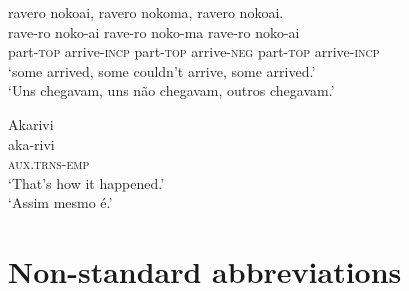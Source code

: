\documentclass[output=paper,
modfonts,nonflat
]{langsci/langscibook}
\begin{document}
\ea ravero nokoai, ravero nokoma, ravero nokoai. \\[.3em]
\gll rave-ro           noko-ai              rave-ro           noko-ma             rave-ro           noko-ai              \\
     part-\textsc{top} arrive-\textsc{incp} part-\textsc{top} arrive-\textsc{neg} part-\textsc{top} arrive-\textsc{incp} \\
\glt `some arrived, some couldn't arrive, some arrived.' \\
`Uns chegavam, uns não chegavam, outros chegavam.' \\
\z

\ea Akarivi \\[.3em]
\gll aka-rivi              \\
     \textsc{aux.trns-emp} \\
\glt `That's how it happened.' \footnotemark \\
`Assim mesmo é.' \\
\z


\section*{Non-standard abbreviations}
\end{document}
